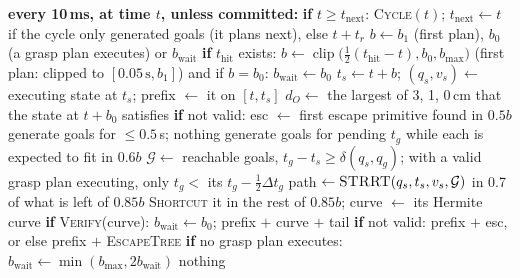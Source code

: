 \documentclass[conference]{IEEEtran}
\begin{document}
\begin{algorithm}[!t]
  \caption{(B): replanning cycle}
  \label{alg:cycle}
  \footnotesize
  \begin{algorithmic}[1]
    \State \textbf{every 10\,ms, at time $t$, unless committed:}
    \State \quad\textbf{if} $t\ge t_{\text{next}}$: \textsc{Cycle}$(t)$; $t_{\text{next}}\gets t$ if the cycle only generated
      goals (it plans next), else $t+t_r$
      \State $b\gets b_1$ (first plan), $b_0$ (a grasp plan executes) or $b_{\text{wait}}$
      \State \textbf{if} $t_{\text{hit}}$ exists: $b\gets\operatorname{clip}\big(\tfrac12(t_{\text{hit}}-t),b_0,
        b_{\max}\big)$ (first plan: clipped to $[0.05\,\text{s},b_1]$)
      \State \quad and if $b=b_0$: $b_{\text{wait}}\gets b_0$
      \State $t_s\gets t+b$; $(q_s,v_s)\gets$ executing state at $t_s$; prefix $\gets$ it on $[t,t_s]$
      \State $d_O\gets$ the largest of 3, 1, 0\,cm that the state at $t+b_0$ satisfies
      \State \textbf{if} not valid: esc $\gets$ first escape primitive found in $0.5b$
       
          \State generate goals for $\le0.5$\,s; \Return nothing 
        \EndIf
        \State generate goals for pending $t_g$ while each is expected to fit in $0.6b$
        \State $\mathcal G\gets$ reachable goals, $t_g-t_s\ge\delta(q_s,q_g)$; with a valid grasp plan
          executing, only $t_g<$ its $t_g-\tfrac12\Delta t_g$
        \State path $\gets\textsc{STRRT}(q_s,t_s,v_s,\mathcal G)$ in 0.7 of what is left of $0.85b$
          \State \textsc{Shortcut} it in the rest of $0.85b$; curve $\gets$ its Hermite curve
          \State \textbf{if} \textsc{Verify}(curve): $b_{\text{wait}}\gets b_0$; \Return prefix $+$ curve $+$ tail
        \EndIf
      \EndIf
      \State \textbf{if} not valid: \Return prefix $+$ esc, or else prefix $+$ \textsc{EscapeTree}
      \State \textbf{if} no grasp plan executes: $b_{\text{wait}}\gets\min(b_{\max},2b_{\text{wait}})$
      \State \Return nothing 
    \EndProcedure
  \end{algorithmic}
\end{algorithm}
\end{document}
